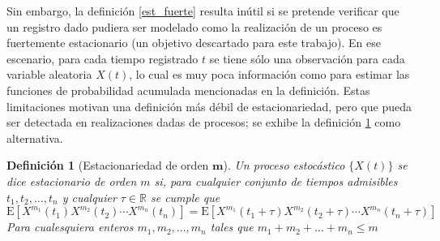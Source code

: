 \documentclass[12pt,a4paper]{mitthesis}
\newtheorem{defn}{Definici\'on}
\newcommand{\R}{\mathbb{R}}
\newcommand{\E}[1]{\mathrm{E}\left[ #1 \right]}
\begin{document}
Sin embargo, la definici\'on \ref{est_fuerte} resulta in\'util
si se pretende verificar que un registro dado pudiera ser modelado como la realizaci\'on de un
proceso es fuertemente estacionario (un objetivo descartado para este trabajo). En ese
escenario,
para cada tiempo registrado $t$ se tiene s\'olo una observaci\'on para cada 
variable aleatoria $X(t)$, lo cual es muy poca informaci\'on como para estimar las funciones de 
probabilidad acumulada mencionadas en la definici\'on.
Estas limitaciones motivan una definici\'on m\'as d\'ebil de estacionariedad,
pero que 
pueda ser 
detectada en realizaciones dadas de procesos;
se exhibe la definici\'on \ref{est_orden_m} como alternativa.

\begin{defn}[Estacionariedad de orden $\boldsymbol{m}$]
Un proceso estoc\'astico $\{ X(t) \}$ se dice estacionario de orden $m$ si, para cualquier conjunto 
de tiempos admisibles $t_1,t_2,\dots,t_n$ y cualquier $\tau \in \R$ se cumple que
\begin{equation*}
\E{ X^{m_1}(t_1)X^{m_2}(t_2)\cdots X^{m_n}(t_n) }
=
\E{ X^{m_1}(t_1+\tau)X^{m_2}(t_2+\tau)\cdots X^{m_n}(t_n+\tau) }
\end{equation*}
Para cualesquiera enteros $m_1,m_2,\dots,m_n$ tales que $m_1+m_2+\dots+m_n \leq m$
\label{est_orden_m}
\end{defn}
\end{document}
